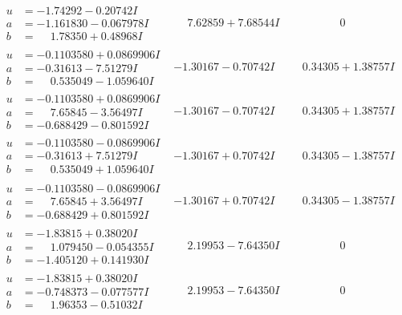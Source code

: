 \documentclass[1p]{elsarticle_modified}
\theoremstyle{definition}
\begin{document}
$$\begin{array}{c|c|c}
\begin{aligned}
u &= -1.74292 - 0.20742 I \\
a &= -1.161830 - 0.067978 I \\
b &= \phantom{-}1.78350 + 0.48968 I\end{aligned}
 & \phantom{-}7.62859 + 7.68544 I & \phantom{-0.000000 } 0 \\ \hline\begin{aligned}
u &= -0.1103580 + 0.0869906 I \\
a &= -0.31613 - 7.51279 I \\
b &= \phantom{-}0.535049 - 1.059640 I\end{aligned}
 & -1.30167 - 0.70742 I & \phantom{-}0.34305 + 1.38757 I \\ \hline\begin{aligned}
u &= -0.1103580 + 0.0869906 I \\
a &= \phantom{-}7.65845 - 3.56497 I \\
b &= -0.688429 - 0.801592 I\end{aligned}
 & -1.30167 - 0.70742 I & \phantom{-}0.34305 + 1.38757 I \\ \hline\begin{aligned}
u &= -0.1103580 - 0.0869906 I \\
a &= -0.31613 + 7.51279 I \\
b &= \phantom{-}0.535049 + 1.059640 I\end{aligned}
 & -1.30167 + 0.70742 I & \phantom{-}0.34305 - 1.38757 I \\ \hline\begin{aligned}
u &= -0.1103580 - 0.0869906 I \\
a &= \phantom{-}7.65845 + 3.56497 I \\
b &= -0.688429 + 0.801592 I\end{aligned}
 & -1.30167 + 0.70742 I & \phantom{-}0.34305 - 1.38757 I \\ \hline\begin{aligned}
u &= -1.83815 + 0.38020 I \\
a &= \phantom{-}1.079450 - 0.054355 I \\
b &= -1.405120 + 0.141930 I\end{aligned}
 & \phantom{-}2.19953 - 7.64350 I & \phantom{-0.000000 } 0 \\ \hline\begin{aligned}
u &= -1.83815 + 0.38020 I \\
a &= -0.748373 - 0.077577 I \\
b &= \phantom{-}1.96353 - 0.51032 I\end{aligned}
 & \phantom{-}2.19953 - 7.64350 I & \phantom{-0.000000 } 0\\

\end{array}$$
\end{document}
